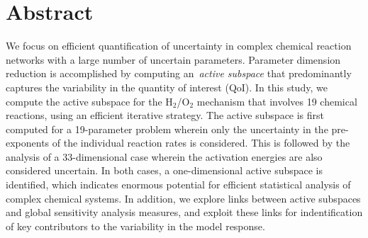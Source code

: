\section*{Abstract}
We focus on efficient quantification of uncertainty in complex chemical
reaction networks with a large number of uncertain parameters.  Parameter
dimension reduction is accomplished by computing an~\emph{active subspace} that
predominantly captures the variability in the quantity of interest (QoI).  In
this study, we compute the active subspace for the H$_2$/O$_2$ mechanism that
involves 19 chemical reactions, using an efficient iterative strategy.  The
active subspace is first computed for a 19-parameter problem wherein only the
uncertainty in the pre-exponents of the individual reaction rates is
considered. This is followed by the analysis of a 33-dimensional case wherein
the activation energies are also considered uncertain.  In both cases, a
one-dimensional active subspace is identified, which indicates
enormous potential for efficient statistical analysis of complex 
chemical systems. In addition, we explore links between active subspaces and
global sensitivity analysis measures, and exploit these links for 
indentification of key contributors to the variability in the model response.


